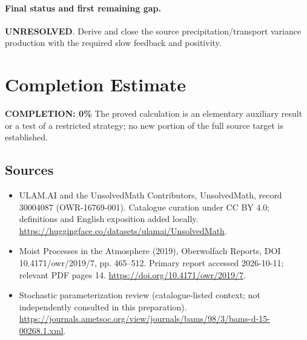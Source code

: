 \documentclass[11pt]{article}
\begin{document}
\paragraph{Final status and first remaining gap.}
\textbf{UNRESOLVED}. Derive and close the source precipitation/transport variance production with the required slow feedback and positivity.

\section{Completion Estimate}
\noindent\textbf{COMPLETION: 0\%}
The proved calculation is an elementary auxiliary result or a test of a restricted strategy; no new portion of the full source target is established.

\subsection{Sources}
\begin{itemize}
\item[\hypertarget{source:30004087:1}{S1}] ULAM.AI and the UnsolvedMath Contributors, UnsolvedMath, record 30004087 (OWR-16769-001). Catalogue curation under CC BY 4.0; definitions and English exposition added locally.
\url{https://huggingface.co/datasets/ulamai/UnsolvedMath}.
\item[\hypertarget{source:30004087:2}{S2}] Moist Processes in the Atmosphere (2019), Oberwolfach Reports, DOI 10.4171/owr/2019/7, pp. 465--512. Primary report accessed 2026-10-11; relevant PDF pages 14.
\url{https://doi.org/10.4171/owr/2019/7}.
\item[\hypertarget{source:30004087:3}{S3}] Stochastic parameterization review (catalogue-listed context; not independently consulted in this preparation).
\url{https://journals.ametsoc.org/view/journals/bams/98/3/bams-d-15-00268.1.xml}.
\end{itemize}
\label{end:30004087}
\end{document}
